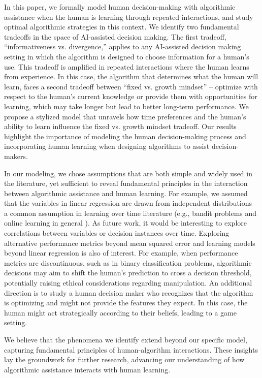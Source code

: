 
In this paper, we formally model human decision-making with algorithmic assistance when the human is learning through repeated interactions, and study optimal algorithmic strategies in this context. 
We identify two fundamental tradeoffs in the space of AI-assisted decision making. The first tradeoff, ``informativeness vs. divergence,''  applies to any AI-assisted decision making setting in which the algorithm is designed to choose information for a human's use. %
This tradeoff is amplified in repeated interactions where the human learns from experience. In this case, the algorithm  that determines what the human will learn, faces a second tradeoff between ``fixed vs. growth mindset'' --  optimize with respect to the human's current knowledge or provide them with opportunities for learning, which may take longer but lead to better long-term performance.
%
We propose a stylized model that unravels how time preferences and the human's ability to learn influence the fixed vs. growth mindset tradeoff. Our results highlight the importance of modeling the human decision-making process and incorporating human learning when designing algorithms to assist decision-makers.


In our modeling, we chose assumptions that are both simple and widely used in the literature, yet sufficient to reveal  fundamental principles in the interaction between algorithmic assistance and human learning. 
For example, we assumed that the variables in linear regression {are drawn from} independent distributions -- a common assumption in learning over time literature (e.g., bandit problems and online learning in general \cite{slivkins2019introduction}). As future work, it would be interesting to explore correlations between variables or decision instances over time. 
Exploring alternative performance metrics beyond mean squared error and learning models beyond linear regression is also of interest. For example, when performance metrics are discontinuous, such as in binary classification problems, algorithmic decisions may aim to %
shift the human's prediction to cross a decision threshold, potentially raising ethical considerations regarding manipulation.
An additional direction is to study a human decision maker who recognizes that the algorithm is optimizing and might not provide the features they expect. In this case, the human might act strategically according to their beliefs, leading to a game setting. 



We believe that the phenomena we identify extend beyond our specific model, capturing fundamental principles of human-algorithm interactions. These insights lay the groundwork for further research, advancing our understanding of how algorithmic assistance interacts with human learning.
